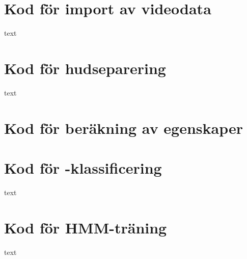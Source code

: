 \documentclass[../rapport_MVEX01-11-05]{subfiles}
\begin{document}

\section{Kod för import av videodata}

text

\section{Kod för hudseparering}

text

\section{Kod för beräkning av egenskaper}\label{sec:matlab:features}

\newpage
{}

\section{Kod för \knn-klassificering}

text

\section{Kod för HMM-träning}

text

\end{document}
